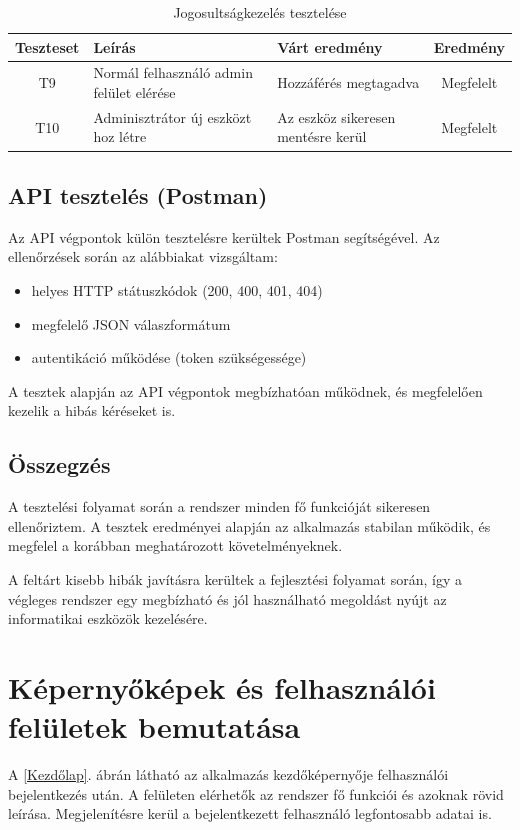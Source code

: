 \documentclass[
]{thesis-ekf}
\theoremstyle{definition}
\theoremstyle{remark}
\begin{document}
\begin{table}[H]
	\centering
	\begin{tabular}{|c|p{4cm}|p{5cm}|c|}
		\hline
		\textbf{Teszteset} & \textbf{Leírás} & \textbf{Várt eredmény} & \textbf{Eredmény} \\
		\hline
		T9 & Normál felhasználó admin felület elérése & Hozzáférés megtagadva & Megfelelt \\
		\hline
		T10 & Adminisztrátor új eszközt hoz létre & Az eszköz sikeresen mentésre kerül & Megfelelt \\
		\hline
	\end{tabular}
	\caption{Jogosultságkezelés tesztelése}
\end{table}

\section{API tesztelés (Postman)}
Az API végpontok külön tesztelésre kerültek Postman segítségével. Az ellenőrzések során az alábbiakat vizsgáltam:
\begin{itemize}
	\item helyes HTTP státuszkódok (200, 400, 401, 404)
	\item megfelelő JSON válaszformátum
	\item autentikáció működése (token szükségessége)
\end{itemize}

A tesztek alapján az API végpontok megbízhatóan működnek, és megfelelően kezelik a hibás kéréseket is.

\section{Összegzés}
A tesztelési folyamat során a rendszer minden fő funkcióját sikeresen ellenőriztem. A tesztek eredményei alapján az alkalmazás stabilan működik, és megfelel a korábban meghatározott követelményeknek.

A feltárt kisebb hibák javításra kerültek a fejlesztési folyamat során, így a végleges rendszer egy megbízható és jól használható megoldást nyújt az informatikai eszközök kezelésére.

\chapter{Képernyőképek és felhasználói felületek bemutatása}

A \ref{Kezdőlap}. ábrán látható az alkalmazás kezdőképernyője felhasználói bejelentkezés után. A felületen elérhetők az rendszer fő funkciói és azoknak rövid leírása. Megjelenítésre kerül a bejelentkezett felhasználó legfontosabb adatai is.
\end{document}
